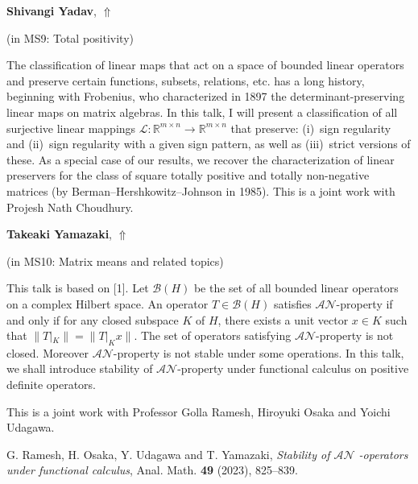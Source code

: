 \documentclass[ILAS2025-program.tex]{subfiles}
\begin{document}
\hypertarget{down0043}{}\begin{ilasabstract}
    
\textbf{Shivangi Yadav},  \hfill \hyperlink{up0043}{$\Uparrow$}
    
    
(in {\color{mstitle}MS9: Total positivity})
        
\mtskip
    The classification of linear maps that act on a space of bounded linear operators and preserve certain functions, subsets, relations, etc. has a long history, beginning with Frobenius, who characterized in 1897 the  determinant-preserving linear maps on matrix algebras. In this talk, I will present a classification of all surjective linear mappings $\mathcal{L}:\mathbb{R}^{m\times n}\to\mathbb{R}^{m\times n}$ that preserve: (i)~sign regularity and (ii)~sign regularity with a given sign pattern, as well as (iii)~strict versions of these. As a special case of our results, we recover the characterization of linear preservers for the class of square totally positive and totally non-negative matrices (by Berman--Hershkowitz--Johnson in 1985). This is a joint work with Projesh Nath Choudhury.

\end{ilasabstract}
    

\hypertarget{down0022}{}\begin{ilasabstract}
    
\textbf{Takeaki Yamazaki},  \hfill \hyperlink{up0022}{$\Uparrow$}
    
    
(in {\color{mstitle}MS10: Matrix means and related topics})
        
\mtskip
    This talk is based on [1].
Let $\mathcal{B}(H)$ be the set of all bounded linear operators on a complex Hilbert space. An operator $T\in \mathcal{B}(H)$ satisfies $\mathcal{AN}$-property if and only if for any closed subspace $K$ of $H$, there exists a unit vector $x\in K$ such that $\|T|_{K}\|=\|T|_{K}x\|$. The set of operators satisfying $\mathcal{AN}$-property is not closed. 
Moreover $\mathcal{AN}$-property is not stable under some operations.
In this talk, we shall introduce stability of $\mathcal{AN}$-property under functional calculus on positive definite operators.

This is a joint work with Professor Golla Ramesh, Hiroyuki Osaka and Yoichi Udagawa.

\noindent
[1] G. Ramesh, H. Osaka,
Y. Udagawa and T. Yamazaki, {\it Stability of  $\mathcal{AN}$ -operators under functional calculus},
Anal. Math. {\bf 49} (2023), 825--839.

\end{ilasabstract}
    
\end{document}
